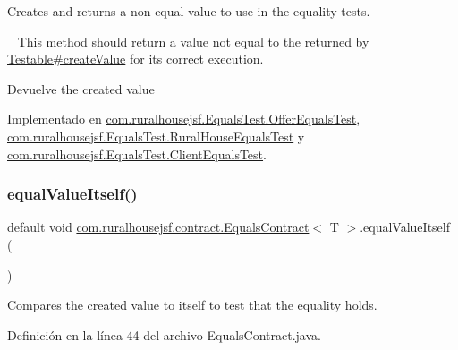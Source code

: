 Creates and returns a non equal value to use in the equality tests. 

~\newline
 This method should return a value not equal to the returned by \mbox{\hyperlink{interfacecom_1_1ruralhousejsf_1_1contract_1_1_testable_ae4546a381488faaba1ef7c0f8688de9c}{Testable\#create\+Value}} for its correct execution.

\begin{DoxyReturn}{Devuelve}
the created value 
\end{DoxyReturn}


Implementado en \mbox{\hyperlink{classcom_1_1ruralhousejsf_1_1_equals_test_1_1_offer_equals_test_a459de0dbb86bdaa6f54b99eb887a2eab}{com.\+ruralhousejsf.\+Equals\+Test.\+Offer\+Equals\+Test}}, \mbox{\hyperlink{classcom_1_1ruralhousejsf_1_1_equals_test_1_1_rural_house_equals_test_a4021dc1a2dacaed55fa5bacec7ca6165}{com.\+ruralhousejsf.\+Equals\+Test.\+Rural\+House\+Equals\+Test}} y \mbox{\hyperlink{classcom_1_1ruralhousejsf_1_1_equals_test_1_1_client_equals_test_a25218bb97f8e3d88b9dd7e13afd0a6ed}{com.\+ruralhousejsf.\+Equals\+Test.\+Client\+Equals\+Test}}.

\mbox{\label{interfacecom_1_1ruralhousejsf_1_1contract_1_1_equals_contract_a5daf9e73e1147c8765c0fcf3d3dddbb0}} 
\subsubsection{\texorpdfstring{equalValueItself()}{equalValueItself()}}
{\footnotesize\ttfamily default void \mbox{\hyperlink{interfacecom_1_1ruralhousejsf_1_1contract_1_1_equals_contract}{com.\+ruralhousejsf.\+contract.\+Equals\+Contract}}$<$ T $>$.equal\+Value\+Itself (\begin{DoxyParamCaption}{ }\end{DoxyParamCaption})}



Compares the created value to itself to test that the equality holds. 



Definición en la línea 44 del archivo Equals\+Contract.\+java.

